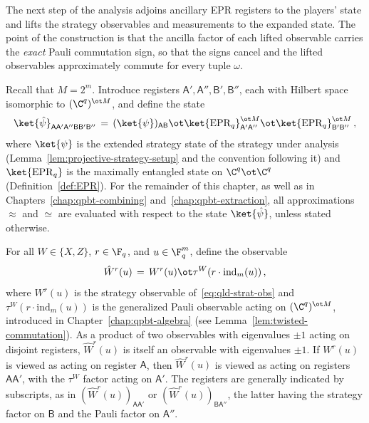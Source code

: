 The next step of the analysis adjoins ancillary EPR registers to the
players' state and lifts the strategy observables and measurements to the
expanded state. The point of the construction is that the ancilla factor of
each lifted observable carries the \emph{exact} Pauli commutation sign, so
that the signs cancel and the lifted observables approximately commute for
every tuple $\omega$.

\begin{definition}
	\label{def:expanded-state}
	\leanok
	Recall that $M = 2^m$. Introduce registers $\mathsf{A}', \mathsf{A}'',
	\mathsf{B}', \mathsf{B}''$, each with Hilbert space isomorphic to
	$(\C^q)^{\ot M}$, and define the state
	\begin{equation}\label{eq:def-psihat}
		\ket{\hat{\psi}}_{\mathsf{A}\mathsf{A}'\mathsf{A}''\mathsf{B}\mathsf{B}'\mathsf{B}''}
		\,=\, (\ket{\psi})_{\mathsf{A}\mathsf{B}}
		\ot \ket{\mathrm{EPR}_q}^{\ot M}_{\mathsf{A}'\mathsf{A}''}
		\ot \ket{\mathrm{EPR}_q}^{\ot M}_{\mathsf{B}'\mathsf{B}''}\,,
	\end{equation}
	where $\ket{\psi}$ is the extended strategy state of the strategy
	under analysis (Lemma~\ref{lem:projective-strategy-setup} and the
	convention following it) and
	$\ket{\mathrm{EPR}_q}$ is the maximally entangled state on
	$\C^q \ot \C^q$ (Definition~\ref{def:EPR}). For the remainder of this
	chapter, as well as in Chapters~\ref{chap:qpbt-combining}
	and~\ref{chap:qpbt-extraction}, all approximations $\approx$ and
	$\simeq$ are evaluated with respect to the state $\ket{\hat{\psi}}$,
	unless stated otherwise.
\end{definition}

\begin{definition}
	\label{def:expanded-observables}
	\leanok
	For all $W \in \{X,Z\}$, $r \in \F_q$, and $u \in \F_q^m$, define the
	observable
	\begin{equation}\label{eq:lc-23}
		\hat{W}^r(u) \,=\, W^r(u) \ot \tau^W(r \cdot \mathrm{ind}_m(u))\,,
	\end{equation}
	where $W^r(u)$ is the strategy observable of~\eqref{eq:qld-strat-obs}
	and $\tau^W(r \cdot \mathrm{ind}_m(u))$ is the generalized Pauli
	observable acting on $(\C^q)^{\ot M}$, introduced in
	Chapter~\ref{chap:qpbt-algebra}
	(see Lemma~\ref{lem:twisted-commutation}). As a product
	of two observables with eigenvalues $\pm 1$ acting on disjoint
	registers, $\hat{W}^r(u)$ is itself an observable with eigenvalues
	$\pm 1$. If $W^r(u)$ is viewed as acting on register $\mathsf{A}$, then
	$\hat{W}^r(u)$ is viewed as acting on registers
	$\mathsf{A}\mathsf{A}'$, with the $\tau^W$ factor acting on
	$\mathsf{A}'$. The registers are generally indicated by subscripts, as
	in $(\hat{W}^r(u))_{\mathsf{A}\mathsf{A}'}$ or
	$(\hat{W}^r(u))_{\mathsf{B}\mathsf{A}''}$, the latter having the
	strategy factor on $\mathsf{B}$ and the Pauli factor on
	$\mathsf{A}''$.
\end{definition}

